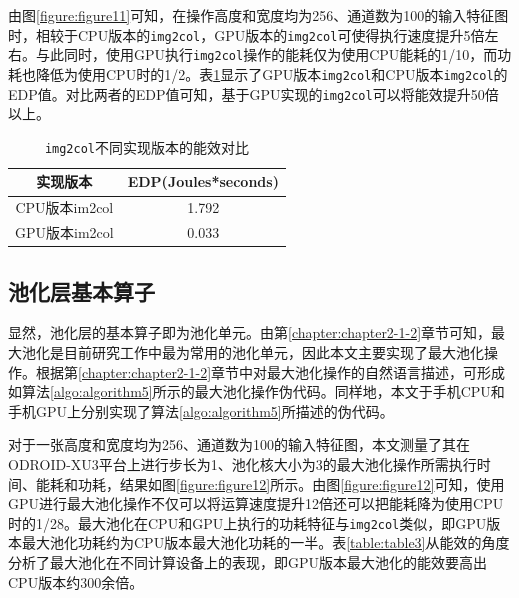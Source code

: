由图\ref{figure:figure11}可知，在操作高度和宽度均为256、通道数为100的输入特征图时，相较于CPU版本的\texttt{img2col}，GPU版本的\texttt{img2col}可使得执行速度提升5倍左右。与此同时，使用GPU执行\texttt{img2col}操作的能耗仅为使用CPU能耗的1/10，而功耗也降低为使用CPU时的1/2。表\ref{table:table2}显示了GPU版本\texttt{img2col}和CPU版本\texttt{img2col}的EDP值。对比两者的EDP值可知，基于GPU实现的\texttt{img2col}可以将能效提升50倍以上。

\begin{table}[htbp]
  \centering
  \caption{\texttt{img2col}不同实现版本的能效对比}
  \label{table:table2}
  \begin{tabular}{cc}
    \toprule
      实现版本 & EDP(Joules*seconds) \\
    \midrule
      CPU版本im2col & 1.792 \\
      GPU版本im2col & 0.033 \\
    \bottomrule
  \end{tabular}
\end{table}


\subsection{池化层基本算子}

显然，池化层的基本算子即为池化单元。由第\ref{chapter:chapter2-1-2}章节可知，最大池化是目前研究工作中最为常用的池化单元，因此本文主要实现了最大池化操作。根据第\ref{chapter:chapter2-1-2}章节中对最大池化操作的自然语言描述，可形成如算法\ref{algo:algorithm5}所示的最大池化操作伪代码。同样地，本文于手机CPU和手机GPU上分别实现了算法\ref{algo:algorithm5}所描述的伪代码。

对于一张高度和宽度均为256、通道数为100的输入特征图，本文测量了其在ODROID-XU3平台上进行步长为1、池化核大小为3的最大池化操作所需执行时间、能耗和功耗，结果如图\ref{figure:figure12}所示。由图\ref{figure:figure12}可知，使用GPU进行最大池化操作不仅可以将运算速度提升12倍还可以把能耗降为使用CPU时的1/28。最大池化在CPU和GPU上执行的功耗特征与\texttt{img2col}类似，即GPU版本最大池化功耗约为CPU版本最大池化功耗的一半。表\ref{table:table3}从能效的角度分析了最大池化在不同计算设备上的表现，即GPU版本最大池化的能效要高出CPU版本约300余倍。

